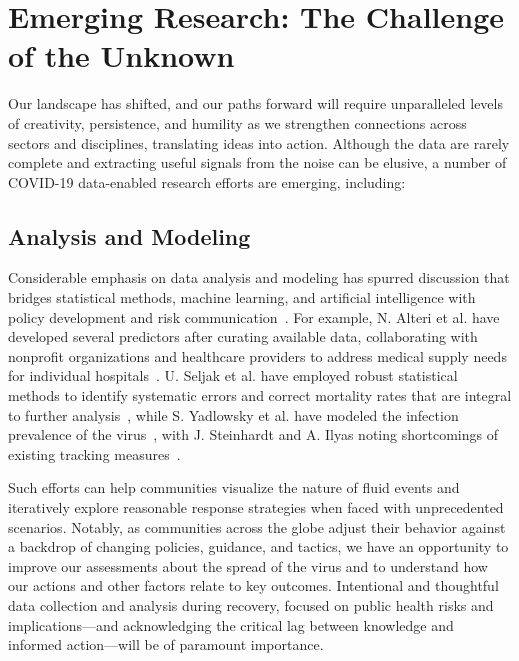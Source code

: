 
\section{Emerging Research: The Challenge of the Unknown}

Our landscape has shifted, and our paths forward will require unparalleled levels of creativity, persistence, and humility as we strengthen connections across sectors and disciplines, translating ideas into action. 
Although the data are rarely complete and extracting useful signals from the noise can be elusive, a number of COVID-19 data-enabled research efforts are emerging, including:

\subsection*{Analysis and Modeling}
Considerable emphasis on data analysis and modeling has spurred discussion that bridges statistical methods, machine learning, and artificial intelligence with policy development and risk communication~\cite{Lewnardm1923, best_boice_2020, institute, covidactnow}. 
For example, N. Alteri et al. have developed several predictors after curating available data, collaborating with nonprofit organizations and healthcare providers to address medical supply needs for individual hospitals~\cite{altieri2020curating}. 
U. Seljak et al. have employed robust statistical methods to identify systematic errors and correct mortality rates that are integral to further analysis~\cite{Modi2020.04.15.20067074}, while S. Yadlowsky et al. have modeled the infection prevalence of the virus~\cite{Yadlowsky2020.03.24.20043067}, with J. Steinhardt and A. Ilyas noting shortcomings of existing tracking measures~\cite{steinhardt}. 

Such efforts can help communities visualize the nature of fluid events and iteratively explore reasonable response strategies when faced with unprecedented scenarios. Notably, as communities across the globe adjust their behavior against a backdrop of changing policies, guidance, and tactics, we have an opportunity to improve our assessments about the spread of the virus and to understand how our actions and other factors relate to key outcomes. Intentional and thoughtful data collection and analysis during recovery, focused on public health risks and implications—and acknowledging the critical lag between knowledge and informed action—will be of paramount importance.

